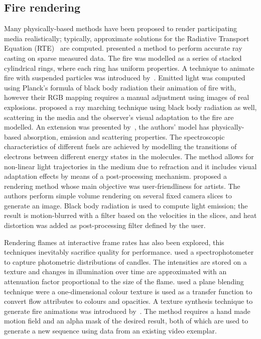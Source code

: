 \documentclass{acmsiggraph}
\begin{document}
\subsection{Fire rendering}

Many physically-based methods have been proposed to render participating media realistically; typically, approximate solutions for the Radiative Transport Equation (RTE)~\cite{Howell:2002} are computed.
\cite{Rushmeier:1995} presented a method to perform accurate ray casting on sparse measured data.
The fire was modelled as a series of stacked cylindrical rings, where each ring has uniform properties.
A technique to animate fire with suspended particles was introduced by~\cite{Feldman:2003}.
Emitted light was computed using Planck's formula of black body radiation their animation of fire with, however their RGB mapping requires a manual adjustment using images of real explosions.
\cite{Nguyen:2002} proposed a ray marching technique using black body radiation as well, scattering in the media and the observer's visual adaptation to the fire are modelled.
An extension was presented by~\cite{Pegoraro:2006}, the authors' model has physically-based absorption, emission and scattering properties.
The spectroscopic characteristics of different fuels are achieved by modelling the transitions of electrons between different energy states in the molecules.
The method allows for non-linear light trajectories  in the medium due to refraction and it includes visual adaptation effects by means of a post-processing mechanism.
\cite{Horvath:2009} proposed a rendering method whose main objective was user-friendliness for artists.
The authors perform simple volume rendering on several fixed camera slices to generate an image.
Black body radiation is used to compute light emission; the result is motion-blurred with a filter based on the velocities in the slices, and heat distortion was added as post-processing filter defined by the user.

Rendering flames at interactive frame rates has also been explored, this techniques inevitably sacrifice quality for performance.
\cite{Bridault:2006} used a spectrophotometer to capture photometric distributions of candles.
The intensities are stored on a texture and changes in illumination over time are approximated with an attenuation factor proportional to the size of the flame.
\cite{Zhang:2011} used a plane blending technique were a one-dimensional colour texture is used as a transfer function to convert flow attributes to colours and opacities. 
A texture synthesis technique to generate fire animations was introduced by~\cite{Jamriska:2015}.
The method requires a hand made motion field and an alpha mask of the desired result, both of which are used to generate a new sequence using data from an existing video exemplar.
\end{document}
